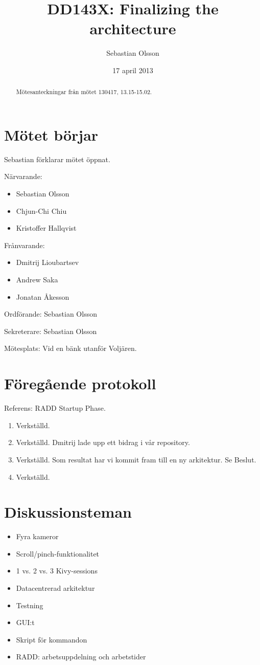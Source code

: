 \documentclass[a4paper,12pt]{article}
\author{Sebastian Olsson}
\title{DD143X: Finalizing the architecture}
\date{17 april 2013}
\begin{document}
\maketitle
\begin{abstract}
    Mötesanteckningar från mötet 130417, 13.15-15.02.
\end{abstract}

\section{Mötet börjar}
Sebastian förklarar mötet öppnat.

Närvarande:
\begin{itemize}
\item Sebastian Olsson
\item Chjun-Chi Chiu
\item Kristoffer Hallqvist
\end{itemize}
Frånvarande:
\begin{itemize}
\item Dmitrij Lioubartsev
\item Andrew Saka
\item Jonatan Åkesson
\end{itemize}

Ordförande: Sebastian Olsson

Sekreterare: Sebastian Olsson

Mötesplats: Vid en bänk utanför Voljären.

\section{Föregående protokoll}
Referens: RADD Startup Phase.

\begin{enumerate}
\item Verkställd.
\item Verkställd. Dmitrij lade upp ett bidrag i vår repository.
\item Verkställd. Som resultat har vi kommit fram till en ny arkitektur. Se Beslut.
\item Verkställd.
\end{enumerate}

\section{Diskussionsteman}
\begin{itemize}
\item Fyra kameror
\item Scroll/pinch-funktionalitet
\item 1 vs. 2 vs. 3 Kivy-sessions
\item Datacentrerad arkitektur
\item Testning
\item GUI:t
\item Skript för kommandon
\item RADD: arbetsuppdelning och arbetstider
\end{itemize}
\end{document}
